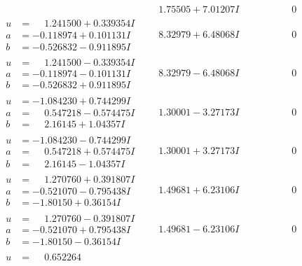 \documentclass[1p]{elsarticle_modified}
\theoremstyle{definition}
\begin{document}
$$\begin{array}{c|c|c}
 & \phantom{-}1.75505 + 7.01207 I & \phantom{-0.000000 } 0 \\ \hline\begin{aligned}
u &= \phantom{-}1.241500 + 0.339354 I \\
a &= -0.118974 + 0.101131 I \\
b &= -0.526832 - 0.911895 I\end{aligned}
 & \phantom{-}8.32979 + 6.48068 I & \phantom{-0.000000 } 0 \\ \hline\begin{aligned}
u &= \phantom{-}1.241500 - 0.339354 I \\
a &= -0.118974 - 0.101131 I \\
b &= -0.526832 + 0.911895 I\end{aligned}
 & \phantom{-}8.32979 - 6.48068 I & \phantom{-0.000000 } 0 \\ \hline\begin{aligned}
u &= -1.084230 + 0.744299 I \\
a &= \phantom{-}0.547218 - 0.574475 I \\
b &= \phantom{-}2.16145 + 1.04357 I\end{aligned}
 & \phantom{-}1.30001 - 3.27173 I & \phantom{-0.000000 } 0 \\ \hline\begin{aligned}
u &= -1.084230 - 0.744299 I \\
a &= \phantom{-}0.547218 + 0.574475 I \\
b &= \phantom{-}2.16145 - 1.04357 I\end{aligned}
 & \phantom{-}1.30001 + 3.27173 I & \phantom{-0.000000 } 0 \\ \hline\begin{aligned}
u &= \phantom{-}1.270760 + 0.391807 I \\
a &= -0.521070 - 0.795438 I \\
b &= -1.80150 + 0.36154 I\end{aligned}
 & \phantom{-}1.49681 + 6.23106 I & \phantom{-0.000000 } 0 \\ \hline\begin{aligned}
u &= \phantom{-}1.270760 - 0.391807 I \\
a &= -0.521070 + 0.795438 I \\
b &= -1.80150 - 0.36154 I\end{aligned}
 & \phantom{-}1.49681 - 6.23106 I & \phantom{-0.000000 } 0 \\ \hline\begin{aligned}
u &= \phantom{-}0.652264\phantom{ +0.000000I} \\

\end{aligned}
\end{array}$$
\end{document}
